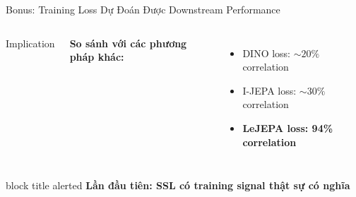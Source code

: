 \documentclass[aspectratio=169,11pt]{beamer}
\newcommand{\takeaway}[1]{%
  \vfill
  \begin{beamercolorbox}[sep=4pt,center,rounded=true]{block title alerted}
    \small\bfseries #1
  \end{beamercolorbox}%
}
\newcommand{\hl}[1]{\textcolor{accent}{\bfseries #1}}
\begin{document}
\begin{frame}{Bonus: Training Loss Dự Đoán Được Downstream Performance}
\begin{columns}[T]
\begin{alertblock}{Implication}
  \end{alertblock}
  \vspace{0pt}
  \scriptsize
  \textbf{So sánh với các phương pháp khác:}
  \begin{itemize}
      \item DINO loss: $\sim 20\%$ correlation
      \item I-JEPA loss: $\sim 30\%$ correlation
      \item \textbf{LeJEPA loss: \hl{94\% correlation}}
  \end{itemize}
\end{columns}
\takeaway{\alert{Lần đầu tiên: SSL có training signal thật sự có nghĩa}}
\end{frame}

\end{document}
